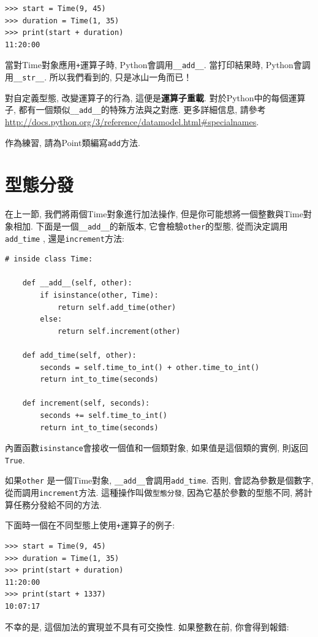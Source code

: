 \documentclass[10pt]{book}
\begin{document}
\begin{verbatim}
>>> start = Time(9, 45)
>>> duration = Time(1, 35)
>>> print(start + duration)
11:20:00
\end{verbatim}
%
當對Time對象應用{\tt +}運算子時, Python會調用\verb"__add__".
當打印結果時, Python會調用\verb"__str__".
所以我們看到的, 只是冰山一角而已！

對自定義型態, 改變運算子的行為, 這便是{\bf 運算子重載}. 
對於Python中的每個運算子, 都有一個類似\verb"__add__"的特殊方法與之對應. 
更多詳細信息, 請參考
\url{http://docs.python.org/3/reference/datamodel.html#specialnames}.

作為練習, 請為Point類編寫{\tt add}方法. 

\section{型態分發}

在上一節, 我們將兩個Time對象進行加法操作, 
但是你可能想將一個整數與Time對象相加. 
下面是一個\verb"__add__"的新版本, 它會檢驗{\tt other}的型態, 
從而決定調用\verb"add_time" , 還是{\tt increment}方法:

\begin{verbatim}
# inside class Time:

    def __add__(self, other):
        if isinstance(other, Time):
            return self.add_time(other)
        else:
            return self.increment(other)

    def add_time(self, other):
        seconds = self.time_to_int() + other.time_to_int()
        return int_to_time(seconds)

    def increment(self, seconds):
        seconds += self.time_to_int()
        return int_to_time(seconds)
\end{verbatim}
%
內置函數{\tt isinstance}會接收一個值和一個類對象, 
如果值是這個類的實例, 則返回{\tt True}.

如果{\tt other} 是一個Time對象, 
\verb"__add__"會調用\verb"add_time". 
否則, 會認為參數是個數字, 從而調用{\tt increment}方法. 
這種操作叫做{\tt 型態分發}, 因為它基於參數的型態不同, 
將計算任務分發給不同的方法. 

下面時一個在不同型態上使用{\tt +}運算子的例子:

\begin{verbatim}
>>> start = Time(9, 45)
>>> duration = Time(1, 35)
>>> print(start + duration)
11:20:00
>>> print(start + 1337)
10:07:17
\end{verbatim}
%
不幸的是, 這個加法的實現並不具有可交換性. 
如果整數在前, 你會得到報錯:
\end{document}
